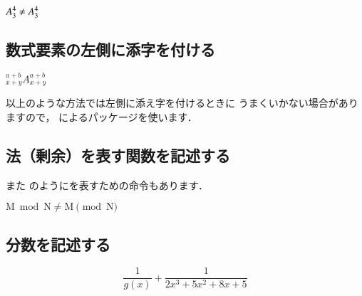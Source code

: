 \begin{inout}
\( A^4_3 \neq A\sp4\sb3 \)
\end{inout}

\subsection{数式要素の左側に添字を付ける}
%
%

\begin{inout}
\( {}^{a+b}_{x+y}A^{a+b}_{x+y} \)
\end{inout}

以上のような方法では左側に添え字を付けるときに
うまくいかない場合がありますので，
によるパッケージを使います．


\subsection{法（剰余）を表す関数を記述する}
また  のように{}を表すための命令もあります．
\begin{usage}
\end{usage}

\begin{inout}
\( \mathrm M\bmod{\mathrm N} \neq 
   \mathrm M\pmod{\mathrm N} \)
\end{inout}

\subsection{分数を記述する}
\begin{usage}
\end{usage}

\begin{inout}
\begin{displaymath}
\frac{1}{g(x)} + \frac{1}{2x^3 + 5x^2 + 8x + 5}
\end{displaymath} 
\end{inout}

